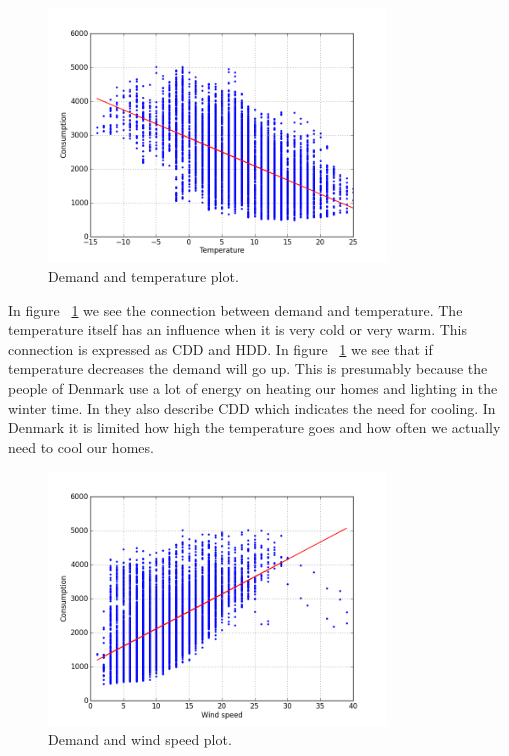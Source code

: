 \begin{figure}[H]
\centering
\includegraphics[width=0.8\textwidth ,natwidth=410,natheight=237]{billeder/energy_price_plots/consump_temp.png}
\caption{Demand and temperature plot.}
\label{fig:consump_temp}
\end{figure}


In figure ~\ref{fig:consump_temp} we see the connection between demand and temperature. The temperature itself has an influence when it is very cold or very warm. This connection is expressed as CDD and HDD. In figure ~\ref{fig:consump_temp} we see that if temperature decreases the demand will go up. This is presumably because the people of Denmark use a lot of energy on heating our homes and lighting in the winter time. In \cite{19} they also describe CDD which indicates the need for cooling. In Denmark it is limited how high the temperature goes and how often we actually need to cool our homes.

\begin{figure}[H]
\centering
\includegraphics[width=0.8\textwidth ,natwidth=410,natheight=237]{billeder/energy_price_plots/consump_wind.png}
\caption{Demand and wind speed plot.}
\label{fig:consump_wind}
\end{figure}

